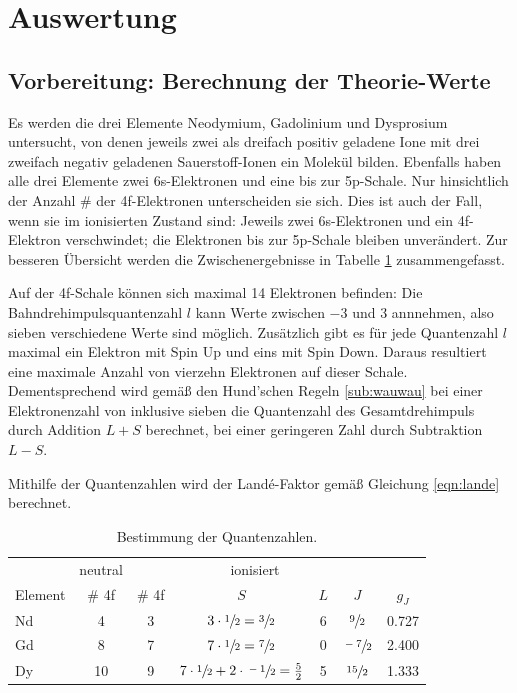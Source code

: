 \section{Auswertung}
\label{sec:Auswertung}

\subsection{Vorbereitung: Berechnung der Theorie-Werte}

    Es werden die drei Elemente Neodymium, Gadolinium und Dysprosium untersucht, von denen jeweils zwei als dreifach positiv geladene 
    Ione mit drei zweifach negativ geladenen Sauerstoff-Ionen ein Molekül bilden. 
    Ebenfalls haben alle drei Elemente zwei 6s-Elektronen und eine bis zur 5p-Schale. Nur hinsichtlich der Anzahl \# der 4f-Elektronen unterscheiden sie sich. 
    Dies ist auch der Fall, wenn sie im ionisierten Zustand sind: 
    Jeweils zwei 6s-Elektronen und ein 4f-Elektron verschwindet; die Elektronen bis zur 5p-Schale bleiben unverändert. 
    Zur besseren Übersicht werden die Zwischenergebnisse in Tabelle \ref{tab:Theo1} zusammengefasst. 

    Auf der 4f-Schale können sich maximal 14 Elektronen befinden: 
    Die Bahndrehimpulsquantenzahl $l$ kann Werte zwischen $-3$ und $3$ annnehmen, also sieben verschiedene Werte sind möglich. 
    Zusätzlich gibt es für jede Quantenzahl $l$ maximal ein Elektron mit Spin Up und eins mit Spin Down. Daraus resultiert eine maximale Anzahl von vierzehn Elektronen auf dieser Schale. 
    Dementsprechend wird gemäß den Hund'schen Regeln \ref{sub:wauwau} bei einer Elektronenzahl von inklusive sieben 
    die Quantenzahl des Gesamtdrehimpuls durch Addition $L+S$ berechnet, bei einer geringeren Zahl durch Subtraktion $L-S$. 

    Mithilfe der Quantenzahlen wird der Landé-Faktor gemäß Gleichung \eqref{eqn:lande} berechnet. 

    \begin{table}
        \centering
        \caption{Bestimmung der Quantenzahlen.}
        \label{tab:Theo1}
        \begin{tabular}{l c c c c c c}
            \toprule
             & 
            neutral & 
            \multicolumn{4}{c}{ionisiert} \\
            \cmidrule(lr){2-2} \cmidrule(lr){3-7}
            Element &
            \# 4f & 
            \# 4f &
            $S$ & 
            $L$ & 
            $J$ &
            $g_J$ \\
            \midrule
            Nd &  4 & 3 & $3\cdot\sfrac{1}{2}=\sfrac{3}{2}$                       & 6 & $\sfrac{9}{2}$  & 0.727 \\
            Gd &  8 & 7 & $7\cdot\sfrac{1}{2}=\sfrac{7}{2}$                       & 0 & $\sfrac{-7}{2}$ & 2.400 \\
            Dy & 10 & 9 & $7\cdot\sfrac{1}{2}+2\cdot\sfrac{-1}{2}=\frac{5}{2}$    & 5 & $\sfrac{15}{2}$ & 1.333 \\
            \bottomrule
        \end{tabular}
    \end{table}

